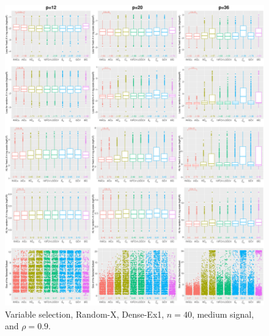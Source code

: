 \begin{figure}[!ht]
\centering
\includegraphics[width=\textwidth]{figures/supplement/randomx/subset_selection/Dense-Ex1_n40_msnr_rho09.eps}
\caption{Variable selection, Random-X, Dense-Ex1, $n=40$, medium signal, and $\rho=0.9$.}
\end{figure}
\clearpage

